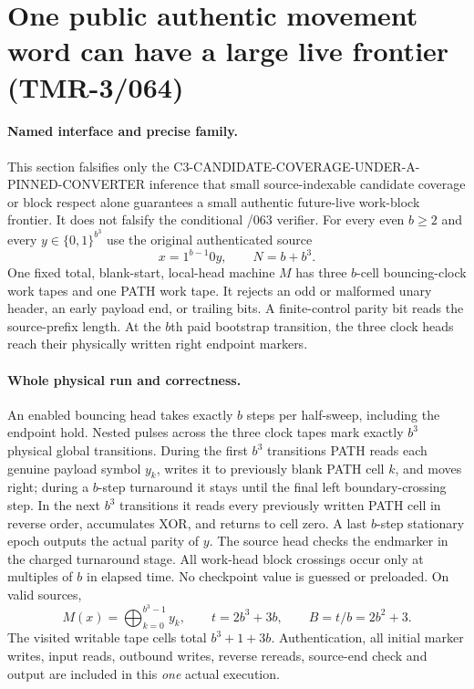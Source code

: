 \documentclass[11pt]{article}
\begin{document}
\section{One public authentic movement word can have a large live frontier (TMR-3/064)}
\paragraph{Named interface and precise family.}
This section falsifies only the \textsf{C3-CANDIDATE-COVERAGE-UNDER-A-PINNED-CONVERTER}
inference that small source-indexable candidate coverage or block respect
alone guarantees a small authentic future-live work-block frontier.
It does not falsify the conditional /063 verifier.
For every even $b\ge2$ and every $y\in\{0,1\}^{b^3}$ use the
original authenticated source
\[
 x=1^{b-1}0y,\qquad N=b+b^3.
\]
One fixed total, blank-start, local-head machine $M$ has three
$b$-cell bouncing-clock work tapes and one PATH work tape.
It rejects an odd or malformed unary header, an early payload end,
or trailing bits. A finite-control parity bit reads the source-prefix
length. At the $b$th paid bootstrap transition, the three clock
heads reach their physically written right endpoint markers.

\paragraph{Whole physical run and correctness.}
An enabled bouncing head takes exactly $b$ steps per half-sweep,
including the endpoint hold. Nested pulses across the three clock
tapes mark exactly $b^3$ physical global transitions.
During the first $b^3$ transitions PATH reads each genuine payload
symbol $y_k$, writes it to previously blank PATH cell $k$, and moves
right; during a $b$-step turnaround it stays until the final left
boundary-crossing step. In the next $b^3$ transitions it reads
every previously written PATH cell in reverse order, accumulates XOR,
and returns to cell zero. A last $b$-step stationary epoch outputs
the actual parity of $y$. The source head checks the endmarker in
the charged turnaround stage. All work-head block crossings occur
only at multiples of $b$ in elapsed time. No checkpoint value is
guessed or preloaded. On valid sources,
\[
 M(x)=\bigoplus_{k=0}^{b^3-1}y_k,\qquad
 t=2b^3+3b,\qquad B=t/b=2b^2+3.
\]
The visited writable tape cells total $b^3+1+3b$.
Authentication, all initial marker writes, input reads,
outbound writes, reverse rereads, source-end check and output are
included in this \emph{one} actual execution.
\end{document}
